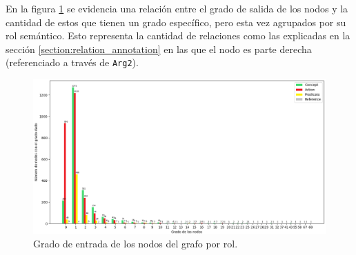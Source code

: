 En la figura \ref{fig:in_degree_nodes_by_rol} se evidencia una relación entre el grado de salida de los nodos y la cantidad de estos que tienen un grado específico, pero esta vez agrupados por su rol semántico. Esto representa la cantidad de relaciones como las explicadas en la sección \ref{section:relation_annotation} en las que el nodo es parte derecha (referenciado a través de \texttt{Arg2}).
\begin{figure}[H]
	\begin{center}
		\includegraphics[width=\textwidth]{graphics/degree4.png}
		\caption[Grado de entrada de los nodos del grafo por rol]{Grado de entrada de los nodos del grafo por rol.}
		\label{fig:in_degree_nodes_by_rol}
	\end{center}
\end{figure}

